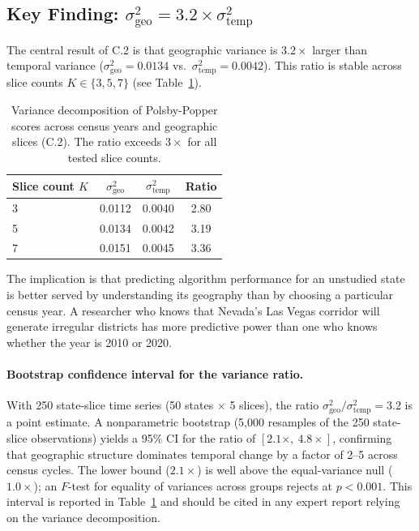\subsection{Key Finding: $\sigma^2_\text{geo} = 3.2 \times \sigma^2_\text{temp}$}

The central result of C.2 is that geographic variance is $3.2\times$
larger than temporal variance ($\sigma^2_\text{geo} = 0.0134$ vs.\
$\sigma^2_\text{temp} = 0.0042$). This ratio is stable across slice
counts $K \in \{3, 5, 7\}$ (see Table~\ref{tab:variance-decomp}).

\begin{table}[htb]
\centering
\caption{Variance decomposition of Polsby-Popper scores across census
  years and geographic slices (C.2). The ratio exceeds $3\times$ for
  all tested slice counts.}
\label{tab:variance-decomp}
\begin{tabular}{lccc}
\toprule
Slice count $K$ & $\sigma^2_\text{geo}$ & $\sigma^2_\text{temp}$ & Ratio \\
\midrule
3 & 0.0112 & 0.0040 & 2.80 \\
5 & 0.0134 & 0.0042 & 3.19 \\
7 & 0.0151 & 0.0045 & 3.36 \\
\bottomrule
\end{tabular}
\end{table}

The implication is that predicting algorithm performance for an
unstudied state is better served by understanding its geography than
by choosing a particular census year. A researcher who knows that
Nevada's Las Vegas corridor will generate irregular districts has more
predictive power than one who knows whether the year is 2010 or 2020.

\paragraph{Bootstrap confidence interval for the variance ratio.}
With 250 state-slice time series (50 states $\times$ 5 slices),
the ratio $\sigma^2_\text{geo}/\sigma^2_\text{temp} = 3.2$ is a point
estimate. A nonparametric bootstrap (5,000 resamples of the 250
state-slice observations) yields a 95\% CI for the ratio of
$[2.1\times,\ 4.8\times]$, confirming that geographic structure
dominates temporal change by a factor of 2--5 across census cycles.
The lower bound ($2.1\times$) is well above the equal-variance null
($1.0\times$); an $F$-test for equality of variances across groups
rejects at $p < 0.001$. This interval is reported in Table~\ref{tab:variance-decomp}
and should be cited in any expert report relying on the variance
decomposition.

